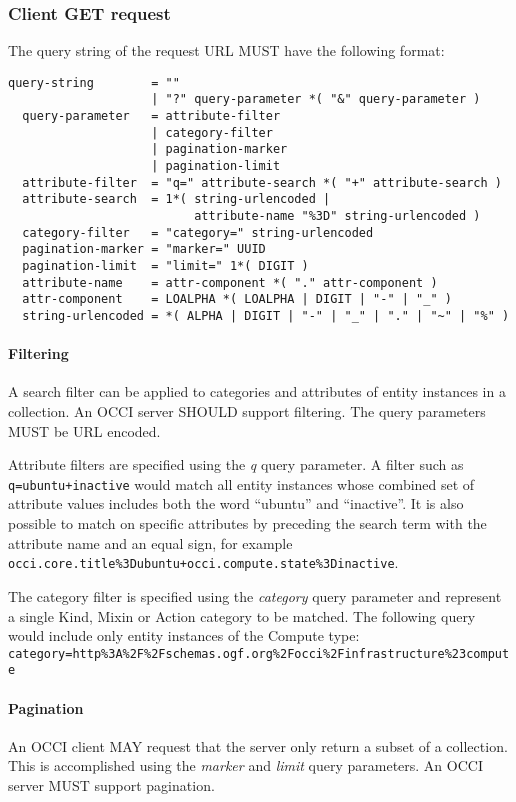 \documentclass[10pt,a4paper]{article}
\begin{document}
\subsubsection{Client GET request}
The query string of the request URL MUST have the following format:
\begin{verbatim}
query-string        = ""
                    | "?" query-parameter *( "&" query-parameter )
  query-parameter   = attribute-filter
                    | category-filter
                    | pagination-marker
                    | pagination-limit
  attribute-filter  = "q=" attribute-search *( "+" attribute-search )
  attribute-search  = 1*( string-urlencoded |
                          attribute-name "%3D" string-urlencoded )
  category-filter   = "category=" string-urlencoded
  pagination-marker = "marker=" UUID
  pagination-limit  = "limit=" 1*( DIGIT )
  attribute-name    = attr-component *( "." attr-component )
  attr-component    = LOALPHA *( LOALPHA | DIGIT | "-" | "_" )
  string-urlencoded = *( ALPHA | DIGIT | "-" | "_" | "." | "~" | "%" )

\end{verbatim}

\paragraph*{Filtering} A search filter can be applied to categories and attributes
of entity instances in a collection. An OCCI server SHOULD support filtering.
The query parameters MUST be URL encoded.

Attribute filters are specified using the {\em q} query parameter.  A filter such
as {\tt q=ubuntu+inactive} would match all entity instances whose combined
set of attribute values includes both the word ``ubuntu'' and ``inactive''. It
is also possible to match on specific attributes by preceding the search term
with the attribute name and an equal sign, for example {\tt
occi.core.title\%3Dubuntu+occi.compute.state\%3Dinactive}.

The category filter is specified using the {\em category} query parameter and
represent a single Kind, Mixin or Action category to be matched. The following
query would include only entity instances of the Compute type:
{\tt category=http\%3A\%2F\%2Fschemas.ogf.org\%2Focci\%2Finfrastructure\%23compute}

\paragraph*{Pagination}
\label{sec:collection:pagination}
An OCCI client MAY request that the server only return
a subset of a collection. This is accomplished using the {\em marker} and
{\em limit} query parameters.  An OCCI server MUST support pagination.
\end{document}
